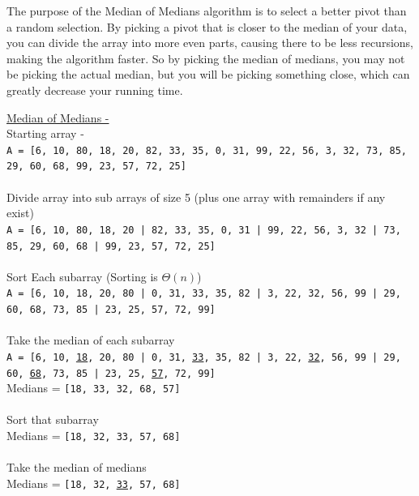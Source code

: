 \documentclass[9pt]{article}
\begin{document}
	\newpage
	\item
		The purpose of the Median of Medians algorithm is to select a better pivot than a random selection. By picking a pivot that is closer to the median of your data, you can divide the array into more even parts, causing there to be less recursions, making the algorithm faster. So by picking the median of medians, you may not be picking the actual median, but you will be picking something close, which can greatly decrease your running time.
	\item \phantom{"nothing"}\begin{center}
		\underline{Median of Medians -}\\
		Starting array - \\
	\texttt{A = [6, 10, 80, 18, 20, 82, 33, 35, 0, 31, 99, 22, 56, 3, 32, 73, 85, 29, 60, 68, 99, 23, 57, 72, 25]}
		\\\phantom{"nothing"}\\Divide array into sub arrays of size 5 (plus one array with remainders if any exist)
		\\\texttt{A = [6, 10, 80, 18, 20 | 82, 33, 35, 0, 31 | 99, 22, 56, 3, 32 | 73, 85, 29, 60, 68 | 99, 23, 57, 72, 25]}
		\\\phantom{"nothing"}\\Sort Each subarray (Sorting is $\Theta (n)$)
		\\\texttt{A = [6, 10, 18, 20, 80 | 0, 31, 33, 35, 82 | 3, 22, 32, 56, 99 | 29, 60, 68, 73, 85 | 23, 25, 57, 72, 99]}
		\\\phantom{"nothing"}\\Take the median of each subarray
		\\\texttt{A = [6, 10, \underline{18}, 20, 80 | 0, 31, \underline{33}, 35, 82 | 3, 22, \underline{32}, 56, 99 | 29, 60, \underline{68}, 73, 85 | 23, 25, \underline{57}, 72, 99]}
		\\Medians = \texttt{[18, 33, 32, 68, 57]}
		\\\phantom{"nothing"}\\Sort that subarray
		\\Medians = \texttt{[18, 32, 33, 57, 68]}
		\\\phantom{"nothing"}\\Take the median of medians
		\\Medians = \texttt{[18, 32, \underline{33}, 57, 68]}
		\\\phantom{"nothing"}\\


\end{center}
\end{document}
